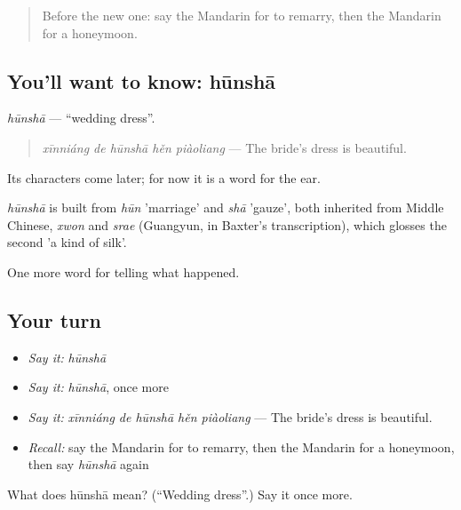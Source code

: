 \label{lesson:ZH-C307-hunsha}



\begin{quote}
Before the new one: say the Mandarin for to remarry, then the Mandarin for a honeymoon.
\end{quote}

\subsection*{You'll want to know: hūnshā}
\emph{hūnshā} — \textquotedblleft{}wedding dress\textquotedblright{}.

\begin{quote}
\emph{xīnniáng de hūnshā hěn piàoliang} — The bride's dress is beautiful.
\end{quote}

Its characters come later; for now it is a word for the ear.

\begin{cousinweb}
\emph{hūnshā} is built from \emph{hūn} 'marriage' and \emph{shā} 'gauze', both inherited from Middle Chinese, \emph{xwon} and \emph{srae} (Guangyun, in Baxter's transcription), which glosses the second 'a kind of silk'.
\end{cousinweb}

\begin{grammarlens}[title={What you've built}]
One more word for telling what happened.
\end{grammarlens}

\subsection*{Your turn}
\begin{itemize}
\raggedright
  \item \emph{Say it:} \emph{hūnshā}
  \item \emph{Say it:} \emph{hūnshā}, once more
  \item \emph{Say it:} \emph{xīnniáng de hūnshā hěn piàoliang} — The bride's dress is beautiful.
  \item \emph{Recall:} say the Mandarin for to remarry, then the Mandarin for a honeymoon, then say \emph{hūnshā} again
\end{itemize}

\begin{tcolorbox}[breakable,colback=teal!4,colframe=teal!35!black,title={Before you move on}]
What does hūnshā mean? (\textquotedblleft{}Wedding dress\textquotedblright{}.) Say it once more.
\end{tcolorbox}
